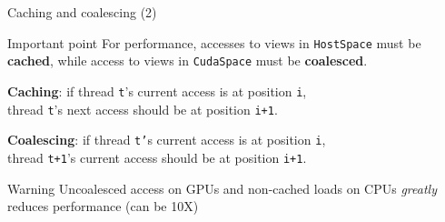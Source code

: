 \begin{frame}[fragile]{Caching and coalescing (2)}

  \begin{block}{Important point}
    For performance, accesses to views in \texttt{HostSpace} must be \textbf{cached}, while access to views in \texttt{CudaSpace} must be \textbf{coalesced}.
  \end{block}

  \vspace{5pt}

  \textbf{Caching}: if thread \texttt{t}'s current access is at position \texttt{i}, \\
  \hspace{20pt} thread \texttt{t}'s next access should be at position \texttt{i+1}.

  \vspace{5pt}

  \textbf{Coalescing}: if thread \texttt{t'}s current access is at position \texttt{i}, \\
  \hspace{20pt} thread \texttt{t+1}'s current access should be at position \texttt{i+1}.

  \pause

  \begin{alertblock}{Warning}
    Uncoalesced access on GPUs and non-cached loads on CPUs \emph{greatly} reduces performance (can be 10X)
  \end{alertblock}

\end{frame}


